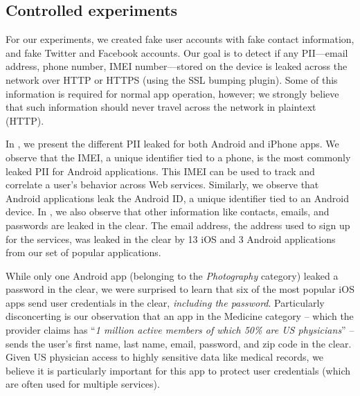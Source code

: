 \subsection{Controlled experiments}

For our experiments, we created fake user accounts with fake contact
information, and fake Twitter and Facebook accounts.  Our goal is to
detect if any PII---email
address, phone number, IMEI number---stored on the device is leaked
across the network over HTTP or HTTPS (using the SSL bumping plugin).
Some of this information is required for normal app operation, however; we strongly believe that such information should
never travel across the network in plaintext (HTTP). 

In , we present the different PII leaked for both Android and iPhone apps.  We observe that
the IMEI, a unique identifier tied to a phone, is the most commonly
leaked PII for Android applications.  This IMEI can be used to track
and correlate a user's behavior across Web services.  Similarly, we
observe that Android applications leak the Android ID, a unique
identifier tied to an Android device.  In , we also
observe that other information like contacts, emails, and passwords
are leaked in the clear.  The email address, the address used to sign
up for the services, was leaked in the clear by 13 iOS and 3 Android
applications from our set of popular applications.

While only one Android app (belonging to the \emph{Photography} category) leaked a password in the clear, 
we were surprised to learn that six of the most popular iOS apps send user 
credentials in the clear, \emph{including the password}. Particularly disconcerting 
is our observation that an app in the Medicine category -- which the provider claims has ``\emph{1 million active members 
of which 50\% are US physicians}'' -- sends the user's first name, last name, 
email, password, and zip code in the clear. Given US physician access to highly sensitive 
data like medical records, we believe it is particularly important for this app to protect 
user credentials (which are often used for multiple services). 


